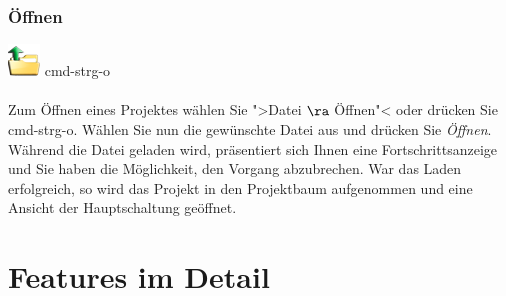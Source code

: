\documentclass[12pt,a4paper]{scrartcl}
\begin{document}
\subsubsection{Öffnen}

		{\Large \hspace{0.5em} \includegraphics[height=2ex]{images/open.png} \hspace{0.5em}\textbullet \hspace{0.5em} \gls{cmd-strg-o} \hspace{0.5em}} \\ \\
Zum Öffnen eines Projektes wählen Sie ">Datei $\ra$ Öffnen"< oder drücken Sie \gls{cmd-strg-o}. Wählen Sie nun die gewünschte Datei aus und drücken Sie \textit{Öffnen}. Während die Datei geladen wird, präsentiert sich Ihnen eine Fortschrittsanzeige und Sie haben die Möglichkeit, den Vorgang abzubrechen. War das Laden erfolgreich, so wird das Projekt in den Projektbaum aufgenommen und eine Ansicht der Hauptschaltung geöffnet.



% 
%
\section{Features im Detail}
\end{document}

